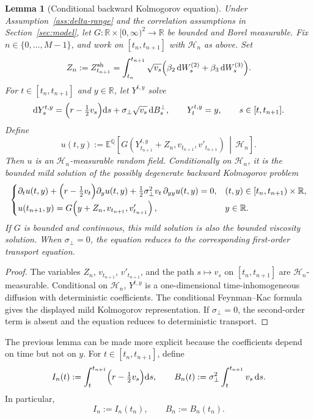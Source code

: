 \documentclass[pdflatex,sn-mathphys-num]{sn-jnl}
\theoremstyle{thmstyleone}%
\newtheorem{lemma}[theorem]{Lemma}
\theoremstyle{thmstylethree}%
\theoremstyle{thmstyletwo}%
\newcommand{\dd}{\mathrm d}
\newcommand{\E}{\mathbb E}
\newcommand{\Q}{\mathbb Q}
\newcommand{\R}{\mathbb R}
\begin{document}
\begin{lemma}[Conditional backward Kolmogorov equation]\label{lem:cond-PDE}
Under Assumption~\ref{ass:delta-range} and the correlation assumptions in
Section~\ref{sec:model}, let $G:\R\times[0,\infty)^2\to\R$ be bounded and Borel
measurable. Fix $n\in\{0,\dots,M-1\}$, and work on $[t_n,t_{n+1}]$ with
$\mathcal H_n$ as above. Set
\[
Z_n:=Z_{t_{n+1}}^{\mathrm{sh}}
=
\int_{t_n}^{t_{n+1}}
\sqrt{v_s}
\Bigl(\beta_2\,\dd W_s^{(2)}+\beta_3\,\dd W_s^{(3)}\Bigr).
\]
For $t\in[t_n,t_{n+1}]$ and $y\in\R$, let $Y^{t,y}$ solve
\[
\dd Y_s^{t,y}
=\Bigl(r-\tfrac12v_s\Bigr)\dd s
+\sigma_\perp\sqrt{v_s}\,\dd B_s^\perp,
\qquad
Y_t^{t,y}=y,
\qquad s\in[t,t_{n+1}].
\]
Define
\[
u(t,y)
:=
\E^\Q\!\left[
G\!\left(
Y_{t_{n+1}}^{t,y}+Z_n,
v_{t_{n+1}},
v'_{t_{n+1}}
\right)
\,\middle|\,
\mathcal H_n
\right].
\]
Then $u$ is an $\mathcal H_n$-measurable random field. Conditionally on
$\mathcal H_n$, it is the bounded mild solution of the possibly degenerate
backward Kolmogorov problem
\[
\begin{cases}
\partial_t u(t,y)
+\Bigl(r-\tfrac12v_t\Bigr)\partial_y u(t,y)
+\frac12\sigma_\perp^2v_t\,\partial_{yy}u(t,y)
=0,
&
(t,y)\in[t_n,t_{n+1})\times\R,
\\[0.4em]
u(t_{n+1},y)
=G\!\left(y+Z_n,v_{t_{n+1}},v'_{t_{n+1}}\right),
&
y\in\R.
\end{cases}
\]
If $G$ is bounded and continuous, this mild solution is also the bounded
viscosity solution. When $\sigma_\perp=0$, the equation reduces to the
corresponding first-order transport equation.
\end{lemma}

\begin{proof}
The variables $Z_n$, $v_{t_{n+1}}$, $v'_{t_{n+1}}$, and the path
$s\mapsto v_s$ on $[t_n,t_{n+1}]$ are $\mathcal H_n$-measurable. Conditional on
$\mathcal H_n$, $Y^{t,y}$ is a one-dimensional time-inhomogeneous diffusion
with deterministic coefficients. The conditional Feynman--Kac formula
\cite[Ch.~5]{karatzas1991brownian} gives the displayed mild Kolmogorov
representation. If $\sigma_\perp=0$, the second-order term is absent and the
equation reduces to deterministic transport.
\end{proof}

The previous lemma can be made more explicit because the coefficients depend on
time but not on $y$. For $t\in[t_n,t_{n+1}]$, define
\[
I_n(t)
:=
\int_t^{t_{n+1}}
\Bigl(r-\tfrac12v_s\Bigr)\dd s,
\qquad
B_n(t)
:=
\sigma_\perp^2\int_t^{t_{n+1}}v_s\,\dd s.
\]
In particular,
\[
I_n:=I_n(t_n),\qquad B_n:=B_n(t_n).
\]
\end{document}
